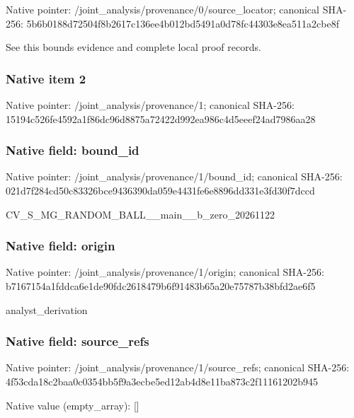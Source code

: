 \documentclass[10pt,a4paper]{article}
\begin{document}
Native pointer: /joint\_analysis/provenan\allowbreak{}ce/0/source\_locator; canonical SHA-256: 5b6b0188d72504f8b2617c13\allowbreak{}6ee4b012bd5491a0d78fc443\allowbreak{}03e8ea511a2cbe8f


See this bounds evidence and complete local proof records.


\subsubsection{Native item 2}


Native pointer: /joint\_analysis/provenance/1; canonical SHA-256: 15194c526fe4592a1f86dc96\allowbreak{}d8875a72422d992ea986c4d5\allowbreak{}eeef24ad7986aa28



\subsubsection{Native field: bound\_id}


Native pointer: /joint\_analysis/provenance/1/bound\_id; canonical SHA-256: 021d7f284cd50c83326bce94\allowbreak{}36390da059e4431fe6e8896d\allowbreak{}d331e3fd30f7dccd


CV\_S\_MG\_RANDOM\_BALL\_\_mai\allowbreak{}n\_\_b\_zero\_20261122


\subsubsection{Native field: origin}


Native pointer: /joint\_analysis/provenance/1/origin; canonical SHA-256: b7167154a1fddca6e1de90fd\allowbreak{}c2618479b6f91483b65a20e7\allowbreak{}5787b38bfd2ae6f5


analyst\_derivation


\subsubsection{Native field: source\_refs}


Native pointer: /joint\_analysis/provenan\allowbreak{}ce/1/source\_refs; canonical SHA-256: 4f53cda18c2baa0c0354bb5f\allowbreak{}9a3ecbe5ed12ab4d8e11ba87\allowbreak{}3c2f11161202b945



Native value (empty\_array): []
\end{document}
